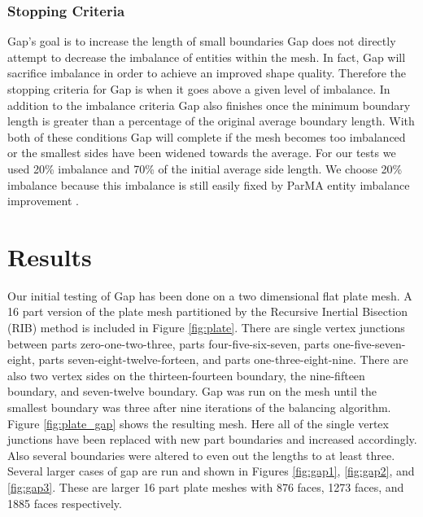 \documentclass{thesis}
\begin{document}
\subsection{Stopping Criteria}
Gap's goal is to increase the length of small boundaries
Gap does not directly attempt to decrease the imbalance of entities within 
the mesh. In fact, Gap will sacrifice imbalance in order to achieve an improved 
shape quality. Therefore the stopping criteria for Gap is when it goes above a 
given level of imbalance. In addition to the imbalance criteria Gap also 
finishes once the minimum boundary length is greater than a percentage of the 
original average boundary length. With both of these conditions Gap will 
complete if the mesh becomes too imbalanced or the smallest sides have been 
widened towards the average. For our tests we used 20\% imbalance and 70\% 
of the initial average side length. We choose 20\% imbalance because this 
imbalance is still easily fixed by ParMA entity imbalance improvement 
\cite{parma,zhougraph,zhou2012}.

\chapter{Results}

Our initial testing of Gap has been done on a two dimensional flat plate mesh. 
A 16 part version of the plate mesh partitioned by  the Recursive Inertial 
Bisection (RIB) method \cite{williamsRIB,taylorRIB} is included in Figure 
\ref{fig:plate}. There are single vertex junctions between parts 
zero-one-two-three, 
parts four-five-six-seven, parts one-five-seven-eight, parts 
seven-eight-twelve-forteen, and parts one-three-eight-nine. There are 
also two vertex sides on the thirteen-fourteen boundary, the nine-fifteen 
boundary, and seven-twelve 
boundary. Gap was run on the mesh until the smallest boundary was three after 
nine 
iterations of the balancing algorithm. Figure \ref{fig:plate_gap} shows the 
resulting mesh. Here all of the single vertex junctions have been replaced with 
new part boundaries and increased accordingly. Also several boundaries were 
altered to even out the lengths to at least three. Several larger cases of gap are run and shown in Figures \ref{fig:gap1}, \ref{fig:gap2}, and \ref{fig:gap3}. These are larger 16 part plate meshes with 876 faces, 1273 faces, and 1885 faces respectively.  \\[5cm]
\end{document}

